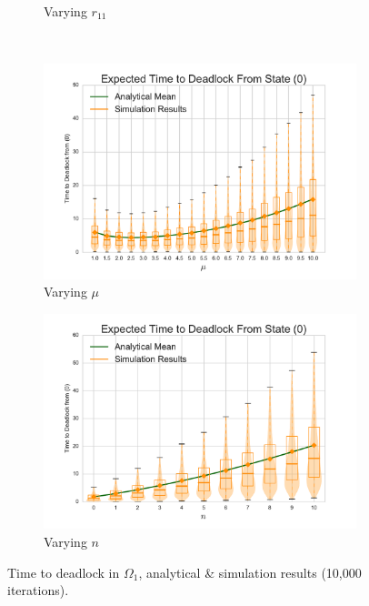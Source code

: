\documentclass{article}
\numberwithin{equation}{section}
\begin{document}
\begin{figure}[!htbp]
\begin{center}
\begin{subfigure}[b]{0.35\textwidth}
  \caption{Varying $r_{11}$}
  \label{fig:timestodeadlock_r11}
\end{subfigure}\\
\begin{subfigure}[b]{0.35\textwidth}
  \includegraphics[width=\textwidth]{images/varymu}
  \caption{Varying $\mu$}
  \label{fig:timestodeadlock_mu}
\end{subfigure}
\begin{subfigure}[b]{0.35\textwidth}
  \includegraphics[width=\textwidth]{images/varyn}
  \caption{Varying $n$}
  \label{fig:timestodeadlock_n}
\end{subfigure}
\end{center}
\caption{Time to deadlock in $\Omega_1$, analytical \& simulation results (10,000 iterations).}
\label{fig:timestodeadlock}
\end{figure}
\end{document}
